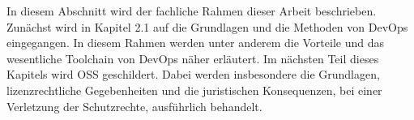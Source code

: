 In diesem Abschnitt wird der fachliche Rahmen dieser Arbeit beschrieben. Zunächst wird in Kapitel 2.1 auf die Grundlagen und die Methoden von DevOps eingegangen. In diesem Rahmen werden unter anderem die Vorteile und das wesentliche Toolchain von DevOps näher erläutert. Im nächsten Teil dieses Kapitels wird OSS geschildert. Dabei werden insbesondere die Grundlagen, lizenzrechtliche Gegebenheiten und die juristischen Konsequenzen, bei einer Verletzung der Schutzrechte, ausführlich behandelt.